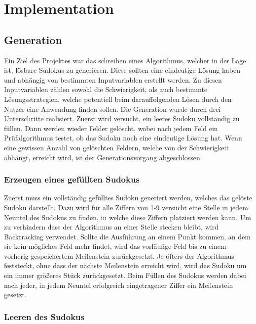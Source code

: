 \section{Implementation}

\subsection{Generation}

Ein Ziel des Projektes war das schreiben eines Algorithmus, welcher in der Lage ist, lösbare Sudokus zu generieren.
Diese sollten eine eindeutige Lösung haben und abhängig von bestimmten Inputvariablen erstellt werden.
Zu diesen Inputvariablen zählen sowohl die Schwierigkeit, als auch bestimmte Lösungsstrategien, welche potentiell beim 
darauffolgenden Lösen durch den Nutzer eine Anwendung finden sollen.
\newline
\newline
Die Generation wurde durch drei Unterschritte realisiert. Zuerst wird versucht, ein leeres Sudoku vollständig zu füllen.
Dann werden wieder Felder gelöscht, wobei nach jedem Feld ein Prüfalgorithmus testet, ob das Sudoku noch eine eindeutige Lösung hat.
Wenn eine gewissen Anzahl von gelöschten Feldern, welche von der Schwierigkeit abhängt, erreicht wird, ist der Generationsvorgang abgeschlossen.

\subsubsection{Erzeugen eines gefüllten Sudokus}

Zuerst muss ein vollständig gefülltes Sudoku generiert werden, welches das gelöste Sudoku darstellt.
Dazu wird für alle Ziffern von 1-9 versucht eine Stelle in jedem Neuntel des Sudokus zu finden, in welche diese Ziffern
platziert werden kann.
Um zu verhindern dass der Algorithmus an einer Stelle stecken bleibt, wird Backtracking verwendet.
Sollte die Ausführung an einem Punkt kommen, an dem sie kein mögliches Feld mehr findet, wird das vorläufige Feld
bis zu einem vorherig gespeichertem Meilenstein zurückgesetzt.
Je öfters der Algorithmus feststeckt, ohne dass der nächste Meilenstein erreicht wird, wird das Sudoku um ein immer größeres Stück
zurückgesetzt.
\newline 
\newline
Beim Füllen des Sudokus werden dabei nach jeder, in jedem Neuntel erfolgreich eingetragener Ziffer ein Meilenstein gesetzt.

\subsubsection{Leeren des Sudokus}

